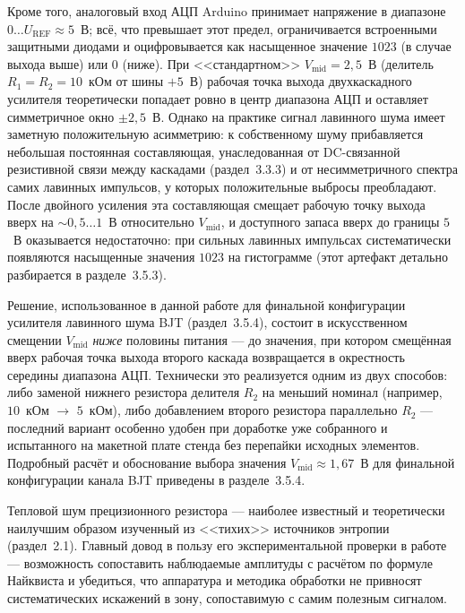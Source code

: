 Кроме того, аналоговый вход АЦП Arduino принимает напряжение в диапазоне $0\ldots
U_\mathrm{REF}\approx 5$~В; всё, что превышает этот предел, ограничивается
встроенными защитными диодами и оцифровывается как насыщенное значение $1023$
(в случае выхода выше) или $0$ (ниже). При <<стандартном>> $V_\mathrm{mid}=2{,}5$~В
(делитель $R_1{=}R_2{=}10$~кОм от шины $+5$~В) рабочая точка выхода
двухкаскадного усилителя теоретически попадает ровно в центр диапазона АЦП и
оставляет симметричное окно $\pm 2{,}5$~В. Однако на практике сигнал
лавинного шума имеет заметную положительную асимметрию: к собственному шуму
прибавляется небольшая постоянная составляющая, унаследованная от
DC-связанной резистивной связи между каскадами (раздел~3.3.3) и от
несимметричного спектра самих лавинных импульсов, у которых положительные
выбросы преобладают. После двойного усиления эта составляющая смещает рабочую
точку выхода вверх на $\sim 0{,}5\ldots 1$~В относительно $V_\mathrm{mid}$, и
доступного запаса вверх до границы $5$~В оказывается недостаточно: при сильных
лавинных импульсах систематически появляются насыщенные значения $1023$ на
гистограмме (этот артефакт детально разбирается в разделе~3.5.3).

Решение, использованное в данной работе для финальной конфигурации усилителя
лавинного шума BJT (раздел~3.5.4), состоит в искусственном смещении $V_\mathrm{mid}$
\emph{ниже} половины питания --- до значения, при котором смещённая вверх
рабочая точка выхода второго каскада возвращается в окрестность середины
диапазона АЦП. Технически это реализуется одним из двух способов: либо заменой
нижнего резистора делителя $R_2$ на меньший номинал (например, $10$~кОм $\to$
$5$~кОм), либо добавлением второго резистора параллельно $R_2$ --- последний
вариант особенно удобен при доработке уже собранного и испытанного на макетной
плате стенда без перепайки исходных элементов. Подробный расчёт и обоснование
выбора значения $V_\mathrm{mid}\approx 1{,}67$~В для финальной конфигурации
канала BJT приведены в разделе~3.5.4.


Тепловой шум прецизионного резистора --- наиболее известный и теоретически наилучшим
образом изученный из <<тихих>> источников энтропии (раздел~2.1). Главный довод в пользу
его экспериментальной проверки в работе --- возможность сопоставить наблюдаемые
амплитуды с расчётом по формуле Найквиста и убедиться, что аппаратура и
методика обработки не привносят систематических искажений в зону, сопоставимую
с самим полезным сигналом.

